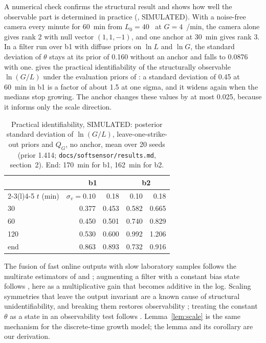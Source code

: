 A numerical check confirms the structural result and shows how well the observable part is determined in practice
(, SIMULATED). With a noise-free camera every minute for 60~min from
$L_0 = 40$~\um{} at $G = 4$~\um/min, the camera alone gives rank 2 with null vector $(1, 1, -1)$, and one anchor at
30~min gives rank 3. In a filter run over b1 with diffuse priors on $\ln L$ and $\ln G$, the standard deviation of
$\theta$ stays at its prior of 0.160 without an anchor and falls to 0.0876 with one.  gives the
practical identifiability of the structurally observable $\ln(G/L)$ under the evaluation priors of
: a standard deviation of 0.45 at 60~min in b1 is a factor of about 1.5 at one sigma, and it widens
again when the medians stop growing. The anchor changes these values by at most 0.025, because it informs only the
scale direction.

\begin{table}
\centering\tabfont
\caption{Practical identifiability, SIMULATED: posterior standard deviation of $\ln(G/L)$, leave-one-strike-out priors
and $Q_G$, no anchor, mean over 20 seeds (prior 1.414; \texttt{docs/softsensor/results.md}, section~2). End: 170~min
for b1, 162~min for b2.}\label{tab:ident}
\begin{tabular}{@{}lrrrr@{}}
\toprule
 & \multicolumn{2}{c}{b1} & \multicolumn{2}{c}{b2} \\
\cmidrule(lr){2-3}\cmidrule(l){4-5}
$t$ (min) & $\sigma_v = 0.10$ & 0.18 & 0.10 & 0.18 \\
\midrule
30 & 0.377 & 0.453 & 0.582 & 0.665 \\
60 & 0.450 & 0.501 & 0.740 & 0.829 \\
120 & 0.530 & 0.600 & 0.992 & 1.206 \\
end & 0.863 & 0.893 & 0.732 & 0.916 \\
\bottomrule
\end{tabular}
\end{table}

The fusion of fast online outputs with slow laboratory samples follows the multirate estimators of \citet{Gudi1995}
and \citet{FatehiHuang2017}; augmenting a filter with a constant bias state follows \citet{Friedland1969}, here as a
multiplicative gain that becomes additive in the log. Scaling symmetries that leave the output invariant are a known cause of
structural unidentifiability, and breaking them restores observability \citep{CastroDeBoer2020,MassonisVillaverde2020};
treating the constant $\theta$ as a state in an observability test follows \citet{Villaverde2019}. Lemma~\ref{lem:scale}
is the same mechanism for the discrete-time growth model; the lemma and its corollary are our derivation.

